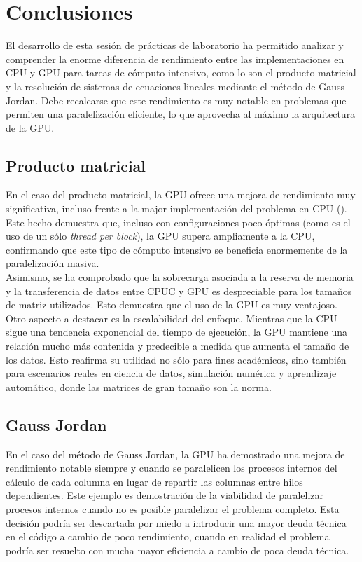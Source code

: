 \pagestyle{fancy}
\fancyhead[LO]{\autorR}
\fancyhead[LE]{\autorA}
\fancyhead[RE,RO]{\textit{\rightmark}}
\fancyfoot[L]{\asignaturaAbbr}
\fancyfoot[R]{\fecha}

\section{Conclusiones} \label{sec:5}
El desarrollo de esta sesión de prácticas de laboratorio ha permitido analizar y comprender la enorme diferencia de rendimiento 
entre las implementaciones en CPU y GPU para tareas de cómputo intensivo, como lo son el producto matricial y la resolución 
de sistemas de ecuaciones lineales mediante el método de Gauss Jordan. Debe recalcarse que este rendimiento es muy notable 
en problemas que permiten una paralelización eficiente, lo que aprovecha al máximo la arquitectura de la GPU.

\subsection{Producto matricial}
En el caso del producto matricial, la GPU ofrece una mejora de rendimiento muy significativa, incluso frente a la major implementación 
del problema en CPU (\zorder). Este hecho demuestra que, incluso con configuraciones poco óptimas (como es el uso de un sólo 
\textit{thread per block}), la GPU supera ampliamente a la CPU, confirmando que este tipo de cómputo intensivo se beneficia 
enormemente de la paralelización masiva. \\
Asimismo, se ha comprobado que la sobrecarga asociada a la reserva de memoria y la transferencia de datos entre CPUC y GPU es 
despreciable para los tamaños de matriz utilizados. Esto demuestra que el uso de la GPU es muy ventajoso.
Otro aspecto a destacar es la escalabilidad del enfoque. Mientras que la CPU sigue una tendencia exponencial del tiempo de 
ejecución, la GPU mantiene una relación mucho más contenida y predecible a medida que aumenta el tamaño de los datos. Esto 
reafirma su utilidad no sólo para fines académicos, sino también para escenarios reales en ciencia de datos, simulación numérica
y aprendizaje automático, donde las matrices de gran tamaño son la norma.

\subsection{Gauss Jordan}
En el caso del método de Gauss Jordan, la GPU ha demostrado una mejora de rendimiento
notable siempre y cuando se paralelicen los procesos internos del cálculo de cada columna
en lugar de repartir las columnas entre hilos dependientes.
Este ejemplo es demostración de la viabilidad de paralelizar
procesos internos cuando no es posible paralelizar el problema completo.
Esta decisión podría ser descartada por miedo a introducir una mayor deuda técnica
en el código a cambio de poco rendimiento,
cuando en realidad el problema podría ser resuelto con mucha mayor eficiencia
a cambio de poca deuda técnica.
